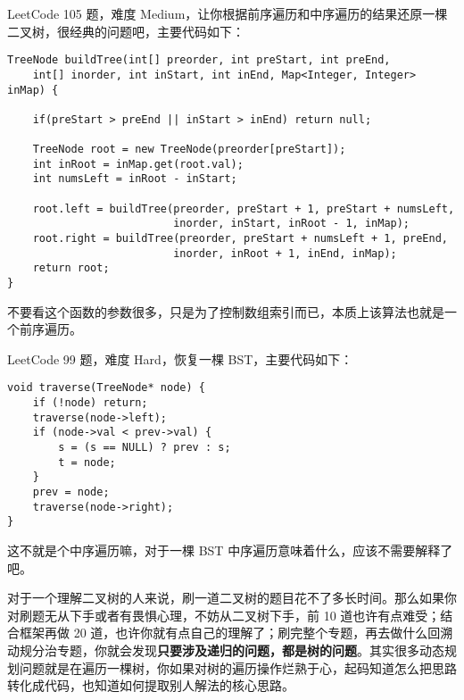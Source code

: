 \documentclass[12pt]{article}
\begin{document}
LeetCode 105 题，难度 Medium，让你根据前序遍历和中序遍历的结果还原一棵二叉树，很经典的问题吧，主要代码如下：
\begin{lstlisting}
TreeNode buildTree(int[] preorder, int preStart, int preEnd, 
    int[] inorder, int inStart, int inEnd, Map<Integer, Integer> inMap) {

    if(preStart > preEnd || inStart > inEnd) return null;

    TreeNode root = new TreeNode(preorder[preStart]);
    int inRoot = inMap.get(root.val);
    int numsLeft = inRoot - inStart;

    root.left = buildTree(preorder, preStart + 1, preStart + numsLeft, 
                          inorder, inStart, inRoot - 1, inMap);
    root.right = buildTree(preorder, preStart + numsLeft + 1, preEnd, 
                          inorder, inRoot + 1, inEnd, inMap);
    return root;
}
\end{lstlisting}
不要看这个函数的参数很多，只是为了控制数组索引而已，本质上该算法也就是一个前序遍历。

LeetCode 99 题，难度 Hard，恢复一棵 BST，主要代码如下：
\begin{lstlisting}
void traverse(TreeNode* node) {
    if (!node) return;
    traverse(node->left);
    if (node->val < prev->val) {
        s = (s == NULL) ? prev : s;
        t = node;
    }
    prev = node;
    traverse(node->right);
}
\end{lstlisting}
这不就是个中序遍历嘛，对于一棵 BST 中序遍历意味着什么，应该不需要解释了吧。

对于一个理解二叉树的人来说，刷一道二叉树的题目花不了多长时间。那么如果你对刷题无从下手或者有畏惧心理，不妨从二叉树下手，前 10 道也许有点难受；结合框架再做 20 道，也许你就有点自己的理解了；刷完整个专题，再去做什么回溯动规分治专题，你就会发现\textbf{只要涉及递归的问题，都是树的问题}。其实很多动态规划问题就是在遍历一棵树，你如果对树的遍历操作烂熟于心，起码知道怎么把思路转化成代码，也知道如何提取别人解法的核心思路。



\end{document}
